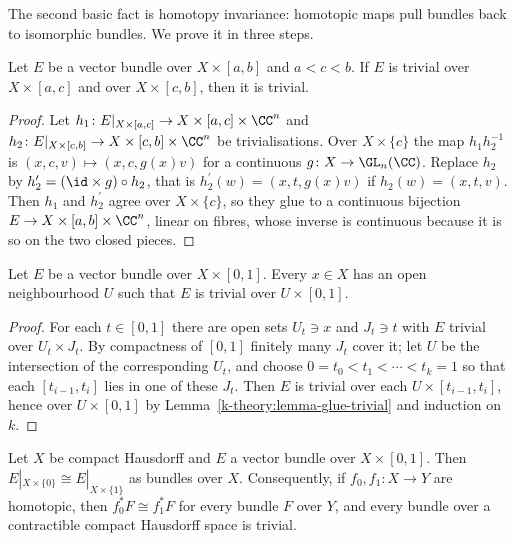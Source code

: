 The second basic fact is homotopy invariance: homotopic maps pull bundles back to isomorphic bundles. We prove it in three steps.

\begin{lemma}\label{k-theory:lemma-glue-trivial}
Let $E$ be a vector bundle over $X \times [a, b]$ and $a < c < b$. If $E$ is trivial over $X \times [a, c]$ and over $X \times [c, b]$, then it is trivial.
\end{lemma}

\begin{proof}
Let $h_1 \colon E|_{X \times [a, c]} \to X \times [a, c] \times \CC^n$ and $h_2 \colon E|_{X \times [c, b]} \to X \times [c, b] \times \CC^n$ be trivialisations. Over $X \times \{c\}$ the map
$h_1h_2^{-1}$ is $(x, c, v) \mapsto (x, c, g(x)v)$ for a continuous $g \colon X \to \GL_n(\CC)$. Replace $h_2$ by $h_2^{\prime} = (\id \times g) \circ h_2$, that is
$h_2^{\prime}(w) = (x, t, g(x)v)$ if $h_2(w) = (x, t, v)$. Then $h_1$ and $h_2^{\prime}$ agree over $X \times \{c\}$, so they glue to a continuous bijection $E \to X \times [a, b] \times \CC^n$, linear on
fibres, whose inverse is continuous because it is so on the two closed pieces.
\end{proof}

\begin{lemma}\label{k-theory:lemma-locally-trivial-cylinder}
Let $E$ be a vector bundle over $X \times [0, 1]$. Every $x \in X$ has an open neighbourhood $U$ such that $E$ is trivial over $U \times [0, 1]$.
\end{lemma}

\begin{proof}
For each $t \in [0, 1]$ there are open sets $U_t \ni x$ and $J_t \ni t$ with $E$ trivial over $U_t \times J_t$. By compactness of $[0, 1]$ finitely many $J_t$ cover it; let $U$ be the intersection of the
corresponding $U_t$, and choose $0 = t_0 < t_1 < \cdots < t_k = 1$ so that each $[t_{i-1}, t_i]$ lies in one of these $J_t$. Then $E$ is trivial over each $U \times [t_{i-1}, t_i]$, hence over
$U \times [0, 1]$ by Lemma~\ref{k-theory:lemma-glue-trivial} and induction on $k$.
\end{proof}

\begin{theorem}\label{k-theory:theorem-homotopy-invariance}
Let $X$ be compact Hausdorff and $E$ a vector bundle over $X \times [0, 1]$. Then $E|_{X \times \{0\}} \cong E|_{X \times \{1\}}$ as bundles over $X$. Consequently, if $f_0, f_1 \colon X \to Y$ are homotopic, then
$f_0^*F \cong f_1^*F$ for every bundle $F$ over $Y$, and every bundle over a contractible compact Hausdorff space is trivial.
\end{theorem}

